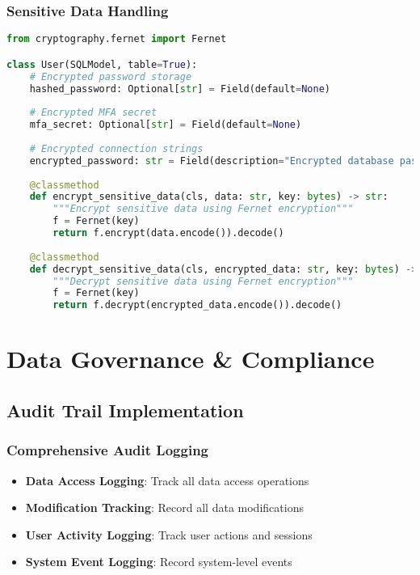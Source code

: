 \subsubsection{Sensitive Data Handling}
\begin{lstlisting}[language=Python, caption=Sensitive Data Encryption]
from cryptography.fernet import Fernet

class User(SQLModel, table=True):
    # Encrypted password storage
    hashed_password: Optional[str] = Field(default=None)
    
    # Encrypted MFA secret
    mfa_secret: Optional[str] = Field(default=None)
    
    # Encrypted connection strings
    encrypted_password: str = Field(description="Encrypted database password")
    
    @classmethod
    def encrypt_sensitive_data(cls, data: str, key: bytes) -> str:
        """Encrypt sensitive data using Fernet encryption"""
        f = Fernet(key)
        return f.encrypt(data.encode()).decode()
    
    @classmethod
    def decrypt_sensitive_data(cls, encrypted_data: str, key: bytes) -> str:
        """Decrypt sensitive data using Fernet encryption"""
        f = Fernet(key)
        return f.decrypt(encrypted_data.encode()).decode()
\end{lstlisting}

\section{Data Governance \& Compliance}

\subsection{Audit Trail Implementation}

\subsubsection{Comprehensive Audit Logging}
\begin{itemize}
    \item \textbf{Data Access Logging}: Track all data access operations
    \item \textbf{Modification Tracking}: Record all data modifications
    \item \textbf{User Activity Logging}: Track user actions and sessions
    \item \textbf{System Event Logging}: Record system-level events
\end{itemize}

